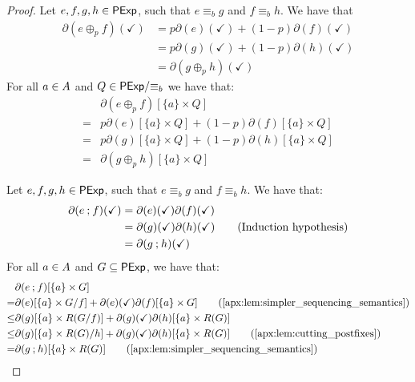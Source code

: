 \begin{proof}
    \item {}
    Let $e,f,g,h \in \mathsf{PExp}$, such that $e \equiv_b g$ and $f \equiv_b h$. We have that
    \begin{align*}
        \partial(e \oplus_p f)(\checkmark) &= p\partial(e)(\checkmark) + (1-p)\partial(f)(\checkmark) \\
        &= p\partial(g)(\checkmark) + (1-p)\partial(h)(\checkmark) \tag{Induction hypothesis}\\
        &= \partial(g \oplus_p h)(\checkmark)
    \end{align*}
    For all $a \in {A}$ and $Q \in {\mathsf{PExp}}/{\equiv_b}$ we have that:
    \begin{align*}
        &\partial(e \oplus_p f)[\{a\} \times Q]\\
        =& p\partial(e)[\{a\} \times Q] + (1-p)\partial(f)[\{a\} \times Q] \\
        =& p\partial(g)[\{a\} \times Q] + (1-p)\partial(h)[\{a\} \times Q] \tag{Induction hypothesis}\\
        =& \partial(g \oplus_p h)[\{a\} \times Q]
    \end{align*}
    \item {} Let $e,f,g,h \in \mathsf{PExp}$, such that $e \equiv_b g$ and $f \equiv_b h$.
    We have that:
    \begin{align*}
        \partial(e \mathbin{;} f)(\checkmark) &= \partial(e)(\checkmark)\partial(f)(\checkmark) \\
        &=\partial(g)(\checkmark)\partial(h)(\checkmark) \tag{Induction hypothesis} \\
        &=\partial(g \mathbin{;} h)(\checkmark)
    \end{align*}
    For all $a \in {A}$ and $G \subseteq \mathsf{PExp}$, we have that:
    \begin{align*}
        &\partial(e \seq f)[\{a\} \times G]\\
        =& \partial(e)[\{a\}\times G/{f}] + \partial(e)(\checkmark)\partial(f)[\{a\} \times G] \tag{\Cref{apx:lem:simpler_sequencing_semantics}}\\
        \leq & \partial(g)[\{a\} \times R(G/f)] + \partial(g)(\checkmark)\partial(h)[\{a\} \times R(G)]\\
        \leq & \partial(g)[\{a\} \times R(G)/h] + \partial(g)(\checkmark)\partial(h)[\{a\} \times R(G)] \tag{\Cref{apx:lem:cutting_postfixes}} \\
        =& \partial(g \seq h)[\{a\} \times R(G)] \tag{\Cref{apx:lem:simpler_sequencing_semantics}}
    \end{align*}


\end{proof}
